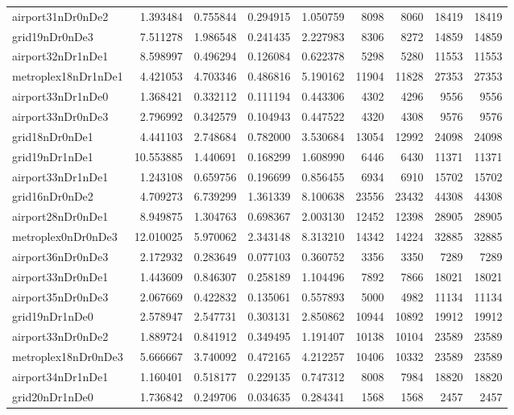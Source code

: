 \begin{longtable}{|l|r|r|r|r|r|r|r|r|}
airport31nDr0nDe2 & 1.393484 & 0.755844 & 0.294915 & 1.050759 & 8098 & 8060 & 18419 & 18419 \\
grid19nDr0nDe3 & 7.511278 & 1.986548 & 0.241435 & 2.227983 & 8306 & 8272 & 14859 & 14859 \\
airport32nDr1nDe1 & 8.598997 & 0.496294 & 0.126084 & 0.622378 & 5298 & 5280 & 11553 & 11553 \\
metroplex18nDr1nDe1 & 4.421053 & 4.703346 & 0.486816 & 5.190162 & 11904 & 11828 & 27353 & 27353 \\
airport33nDr1nDe0 & 1.368421 & 0.332112 & 0.111194 & 0.443306 & 4302 & 4296 & 9556 & 9556 \\
airport33nDr0nDe3 & 2.796992 & 0.342579 & 0.104943 & 0.447522 & 4320 & 4308 & 9576 & 9576 \\
grid18nDr0nDe1 & 4.441103 & 2.748684 & 0.782000 & 3.530684 & 13054 & 12992 & 24098 & 24098 \\
grid19nDr1nDe1 & 10.553885 & 1.440691 & 0.168299 & 1.608990 & 6446 & 6430 & 11371 & 11371 \\
airport33nDr1nDe1 & 1.243108 & 0.659756 & 0.196699 & 0.856455 & 6934 & 6910 & 15702 & 15702 \\
grid16nDr0nDe2 & 4.709273 & 6.739299 & 1.361339 & 8.100638 & 23556 & 23432 & 44308 & 44308 \\
airport28nDr0nDe1 & 8.949875 & 1.304763 & 0.698367 & 2.003130 & 12452 & 12398 & 28905 & 28905 \\
metroplex0nDr0nDe3 & 12.010025 & 5.970062 & 2.343148 & 8.313210 & 14342 & 14224 & 32885 & 32885 \\
airport36nDr0nDe3 & 2.172932 & 0.283649 & 0.077103 & 0.360752 & 3356 & 3350 & 7289 & 7289 \\
airport33nDr0nDe1 & 1.443609 & 0.846307 & 0.258189 & 1.104496 & 7892 & 7866 & 18021 & 18021 \\
airport35nDr0nDe3 & 2.067669 & 0.422832 & 0.135061 & 0.557893 & 5000 & 4982 & 11134 & 11134 \\
grid19nDr1nDe0 & 2.578947 & 2.547731 & 0.303131 & 2.850862 & 10944 & 10892 & 19912 & 19912 \\
airport33nDr0nDe2 & 1.889724 & 0.841912 & 0.349495 & 1.191407 & 10138 & 10104 & 23589 & 23589 \\
metroplex18nDr0nDe3 & 5.666667 & 3.740092 & 0.472165 & 4.212257 & 10406 & 10332 & 23589 & 23589 \\
airport34nDr1nDe1 & 1.160401 & 0.518177 & 0.229135 & 0.747312 & 8008 & 7984 & 18820 & 18820 \\
grid20nDr1nDe0 & 1.736842 & 0.249706 & 0.034635 & 0.284341 & 1568 & 1568 & 2457 & 2457 \\

\end{longtable}
